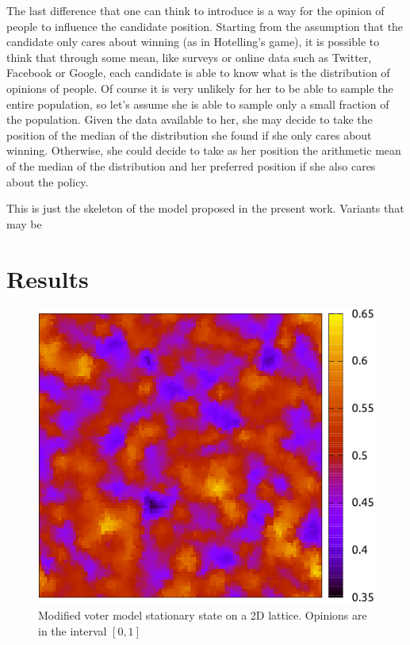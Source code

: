 \documentclass[11pt,a4paper,twocolumn]{article}
\begin{document}
The last difference that one can think to introduce is a way for the opinion of people to influence the candidate position.
Starting from the assumption that the candidate only cares about winning (as in Hotelling's game), it is possible to think that through some mean, like surveys or online data such as Twitter, Facebook or Google, each candidate is able to know what is the distribution of opinions of people. Of course it is very unlikely for her to be able to sample the entire population, so let's assume she is able to sample only a small fraction of the population. Given the data available to her, she may decide to take the position of the median of the distribution she found if she only cares about winning. Otherwise, she could decide to take as her position the arithmetic mean of the median of the distribution and her preferred position if she also cares about the policy.

This is just the skeleton of the model proposed in the present work. Variants that may be

\vspace{-15pt}
\section{Results}
\vspace{-10pt}
\label{sec:results}

\begin{figure}
\includegraphics[scale=1]{pictures/voter_mod-crop.pdf}
\caption{Modified voter model stationary state on a 2D lattice. Opinions are in the interval $[0,1]$}
\label{fig:voter.mod}
\end{figure}
\end{document}
